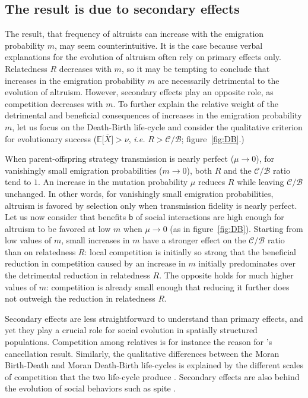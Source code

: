 \documentclass[11pt, letterpaper]{article}
\newcommand{\ie}{\textit{i.e.}}
\newcommand{\Esp}[1]{\mathbb{E}\big[ #1\big]}%
\newcommand{\bb}{\mathsf{b}}
\newcommand{\mutbias}{\nu}
\begin{document}
\subsection*{The result is due to secondary effects}
The result, that frequency of altruists can increase with the emigration probability $m$, may seem counterintuitive. It is the case because verbal explanations for the evolution of altruism often rely on primary effects only. Relatedness $R$ decreases with $m$, so it may be tempting to conclude that increases in the emigration probability $m$ are necessarily detrimental to the evolution of altruism. However, secondary effects play an opposite role, as competition decreases with $m$. To further explain the relative weight of the detrimental and beneficial consequences of increases in the emigration probability $m$, let us focus on the Death-Birth life-cycle and consider the qualitative criterion for evolutionary success ($\Esp{\overline{X}}>\mutbias$, \ie{} $R > \mathcal{C}/\mathcal{B}$; figure~\ref{fig:DB}.)

When parent-offspring strategy transmission is nearly perfect ($\mu \to 0$), for vanishingly small emigration probabilities ($m \to 0$), both $R$ and the $\mathcal{C}/\mathcal{B}$ ratio tend to $1$. An increase in the mutation probability $\mu$ reduces $R$ while leaving $\mathcal{C}/\mathcal{B}$ unchanged. In other words, for vanishingly small emigration probabilities, altruism is favored by selection only when transmission fidelity is nearly perfect. Let us now consider that benefits $\bb$ of social interactions are high enough for altruism to be favored at low $m$ when $\mu \to 0$ (as in figure~\ref{fig:DB}). Starting from low values of $m$, small increases in $m$ have a stronger effect on the $\mathcal{C}/\mathcal{B}$ ratio than on relatedness $R$: local competition is initially so strong that the beneficial reduction in competition caused by an increase in $m$ initially predominates over the detrimental reduction in relatedness $R$. The opposite holds for much higher values of $m$: competition is already small enough that reducing it further does not outweigh the reduction in relatedness $R$. 

Secondary effects are less straightforward to understand than primary effects, and yet they play a crucial role for social evolution in spatially structured populations. Competition among relatives is for instance the reason for \citet{Taylor1992}'s cancellation result. Similarly, the qualitative differences between the Moran Birth-Death and Moran Death-Birth life-cycles is explained by the different scales of competition that the two life-cycle produce \citep{GrafenArchetti2008, DebarreHD2014}. Secondary effects are also behind the evolution of social behaviors such as spite \citep{WestGardner2010}. 
\end{document}
